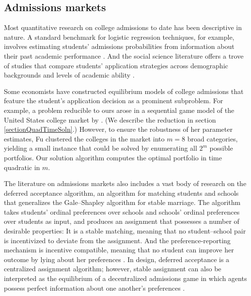 \subsection{Admissions markets}

Most quantitative research on college admissions to date has been descriptive in nature. A standard benchmark for logistic regression techniques, for example, involves estimating students' admissions probabilities from information about their past academic performance \citep{acharyaetal2019,lim2013}. And the social science literature offers a trove of studies that compare students' application strategies across demographic backgrounds and levels of academic ability \citep{gurantzetal2021,hartlaubandschneider2012,hoxbyandturner2013,hoxbyandavery2012}.

Some economists have constructed equilibrium models of college admissions that feature the student's application decision as a prominent subproblem. For example, a problem reducible to ours arose in a sequential game model of the United States college market by \cite{fu2014}. (We describe the reduction in section \ref{sectionQuadTimeSoln}.) However, to ensure the robustness of her parameter estimates, Fu clustered the colleges in the market into $m=8$ broad categories, yielding a small instance that could be solved by enumerating all $2^m$ possible portfolios. Our solution algorithm computes the optimal portfolio in time quadratic in $m$. 

The literature on admissions markets also includes a vast body of research on the deferred acceptance algorithm, an algorithm for matching students and schools that generalizes the Gale--Shapley algorithm for stable marriage. The algorithm takes students' ordinal preferences over schools and schools' ordinal preferences over students as input, and produces an assignment that possesses a number of desirable properties: It is a stable matching, meaning that no student--school pair is incentivized to deviate from the assignment. And the preference-reporting mechanism is incentive compatible, meaning that no student can improve her outcome by lying about her preferences \citep{galeandshapley1962,roth1982}. In design, deferred acceptance is a centralized assignment algorithm; however, stable assignment can also be interpreted as the equilibrium of a decentralized admissions game in which agents possess perfect information about one another's preferences \citep{azevedoandleshno2016}.

